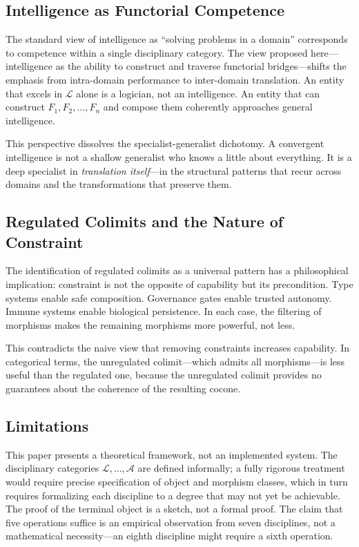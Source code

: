 \documentclass[11pt,a4paper]{article}
\begin{document}
\subsection{Intelligence as Functorial Competence}

The standard view of intelligence as ``solving problems in a domain'' corresponds to competence within a single disciplinary category. The view proposed here---intelligence as the ability to construct and traverse functorial bridges---shifts the emphasis from intra-domain performance to inter-domain translation. An entity that excels in $\mathcal{L}$ alone is a logician, not an intelligence. An entity that can construct $F_1, F_2, \ldots, F_n$ and compose them coherently approaches general intelligence.

This perspective dissolves the specialist-generalist dichotomy. A convergent intelligence is not a shallow generalist who knows a little about everything. It is a deep specialist in \emph{translation itself}---in the structural patterns that recur across domains and the transformations that preserve them.

\subsection{Regulated Colimits and the Nature of Constraint}

The identification of regulated colimits as a universal pattern has a philosophical implication: constraint is not the opposite of capability but its precondition. Type systems enable safe composition. Governance gates enable trusted autonomy. Immune systems enable biological persistence. In each case, the filtering of morphisms makes the remaining morphisms more powerful, not less.

This contradicts the naive view that removing constraints increases capability. In categorical terms, the unregulated colimit---which admits all morphisms---is less useful than the regulated one, because the unregulated colimit provides no guarantees about the coherence of the resulting cocone.

\subsection{Limitations}

This paper presents a theoretical framework, not an implemented system. The disciplinary categories $\mathcal{L}, \ldots, \mathcal{A}$ are defined informally; a fully rigorous treatment would require precise specification of object and morphism classes, which in turn requires formalizing each discipline to a degree that may not yet be achievable. The proof of the terminal object is a sketch, not a formal proof. The claim that five operations suffice is an empirical observation from seven disciplines, not a mathematical necessity---an eighth discipline might require a sixth operation.
\end{document}
